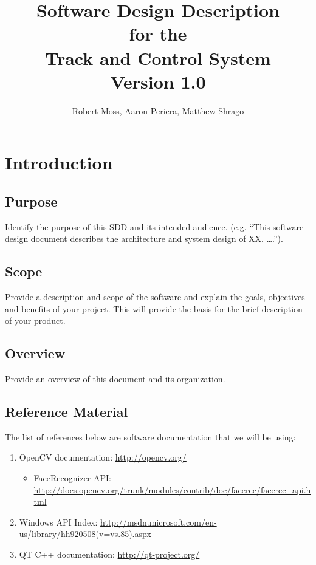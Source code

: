 \documentclass[titlepage]{article}
\begin{document}
\title{
\textbf{
Software Design Description}
\protect\\
for the
\protect\\
\textbf{
Track and Control System}
\protect\\
{\small Version 1.0}}

\author{Robert Moss, Aaron Periera, Matthew Shrago}
\maketitle

\newpage
\tableofcontents{} 
\newpage

\section{Introduction}

\subsection{Purpose}
Identify the purpose of this SDD and its intended audience. (e.g. “This software design document describes the architecture and system design of XX. ….”). 

\subsection{Scope}
Provide a description and scope of the software and explain the goals, objectives and benefits of your project. This will provide the basis for the brief description of your product.

\subsection{Overview}
Provide an overview of this document and its organization.

\subsection{Reference Material}
The list of references below are software documentation that we will be using:
\begin{enumerate}
	\item OpenCV documentation: \href{http://opencv.org/}{\color{blue} http://opencv.org/}
	\begin{itemize}
		\item FaceRecognizer API: \href{http://docs.opencv.org/trunk/modules/contrib/doc/facerec/facerec\_api.html}{\color{blue} http://docs.opencv.org/trunk/modules/contrib/doc/facerec/facerec\_api.html}
	\end{itemize}
	\item Windows API Index: \href{http://msdn.microsoft.com/en-us/library/hh920508(v=vs.85).aspx}{\color{blue} http://msdn.microsoft.com/en-us/library/hh920508(v=vs.85).aspx}
	\item QT C++ documentation: \href{http://qt-project.org/}{\color{blue} http://qt-project.org/}
\end{enumerate}
\end{document}
